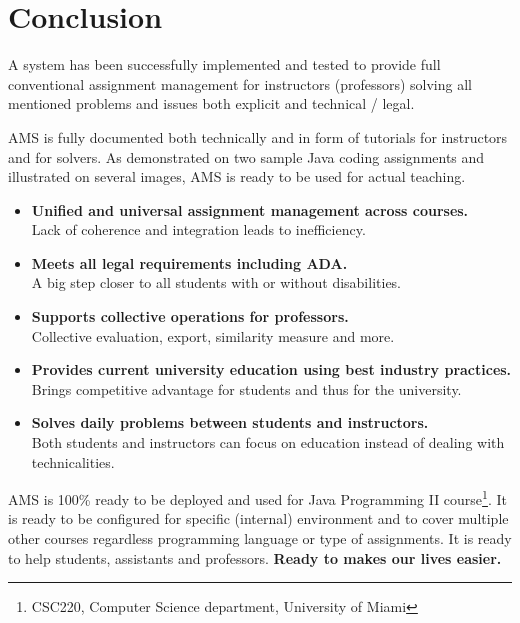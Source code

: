 \chapter{Conclusion} \label{chap:conclusion}

A system has been successfully implemented and tested to provide full conventional assignment management for instructors (professors) solving all mentioned problems and issues both explicit and technical / legal.

AMS is fully documented both technically and in form of tutorials for instructors and for solvers. As demonstrated on two sample Java coding assignments and illustrated on several images, AMS is ready to be used for actual teaching.

\begin{itemize}
    \item \textbf{Unified and universal assignment management across courses.}\\
    Lack of coherence and integration leads to inefficiency.
    \item \textbf{Meets all legal requirements including ADA.}\\
    A big step closer to all students with or without disabilities.
    \item \textbf{Supports collective operations for professors.}\\
    Collective evaluation, export, similarity measure and more.
    \item \textbf{Provides current university education using best industry practices.}\\
    Brings competitive advantage for students and thus for the university.
    \item \textbf{Solves daily problems between students and instructors.}\\
    Both students and instructors can focus on education instead of dealing with technicalities.
\end{itemize}

AMS is 100\% ready to be deployed and used for Java Programming II course\footnote{CSC220, Computer Science department, University of Miami}. It is ready to be configured for specific (internal) environment and to cover multiple other courses regardless programming language or type of assignments. It is ready to help students, assistants and professors. \textbf{Ready to makes our lives easier.}
